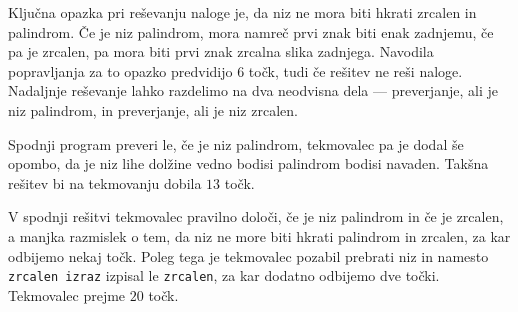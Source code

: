 

Ključna opazka pri reševanju naloge je, da niz ne mora biti hkrati zrcalen in
palindrom.
Če je niz palindrom, mora namreč prvi znak biti enak zadnjemu, če pa je zrcalen,
pa mora biti prvi znak zrcalna slika zadnjega.
Navodila popravljanja za to opazko predvidijo $6$ točk, tudi če rešitev ne reši
naloge.
Nadaljnje reševanje lahko razdelimo na dva neodvisna dela --- preverjanje, ali
je niz palindrom, in preverjanje, ali je niz zrcalen.

Spodnji program preveri le, če je niz palindrom, tekmovalec pa je dodal še
opombo, da je niz lihe dolžine vedno bodisi palindrom bodisi navaden.
Takšna rešitev bi na tekmovanju dobila $13$ točk.


V spodnji rešitvi tekmovalec pravilno določi, če je niz palindrom in če je
zrcalen, a manjka razmislek o tem, da niz ne more biti hkrati palindrom in
zrcalen, za kar odbijemo nekaj točk.
Poleg tega je tekmovalec pozabil prebrati niz in namesto \texttt{zrcalen izraz}
izpisal le \texttt{zrcalen}, za kar dodatno odbijemo dve točki.
Tekmovalec prejme $20$ točk.


